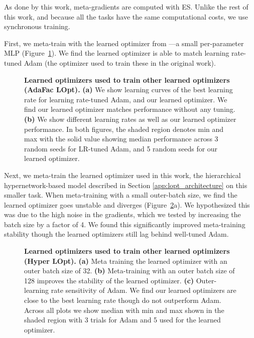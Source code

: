 \documentclass[11pt]{article}
\begin{document}
As done by this work, meta-gradients are computed with ES. Unlike the rest of this work, and because all the tasks have the same computational costs, we use synchronous training.

First, we meta-train with the learned optimizer from \citet{metz2022practical}---a small per-parameter MLP (Figure~\ref{fig:selfopt_adafac}).
We find the learned optimizer is able to match learning rate-tuned Adam (the optimizer used to train these in the original work).

\begin{figure}[t!]
    \centering
    \caption{\textbf{Learned optimizers used to train other learned optimizers (AdaFac LOpt).} \textbf{(a)} We show learning curves of the best learning rate for learning rate-tuned Adam, and our learned optimizer. We find our learned optimizer matches performance without any tuning. \textbf{(b)} We show different learning rates as well as our learned optimizer performance. In both figures, the shaded region denotes min and max with the solid value showing median performance across 3 random seeds for LR-tuned Adam, and 5 random seeds for our learned optimizer.
    \label{fig:selfopt_adafac}
    }
\end{figure}

Next, we meta-train the learned optimizer used in this work, the hierarchical hypernetwork-based model described in Section \ref{app:lopt_architecture} on this smaller task.  
When meta-training with a small outer-batch size, we find the learned optimizer goes unstable and diverges (Figure~\ref{fig:selfopt_hyperlopt}a).
We hypothesized this was due to the high noise in the gradients, which we tested by increasing the batch size by a factor of 4.
We found this significantly improved meta-training stability though the learned optimizers still lag behind well-tuned Adam.

\begin{figure}[t!]
    \centering
    \caption{\textbf{Learned optimizers used to train other learned optimizers (Hyper LOpt).} \textbf{(a)} Meta training the learned optimizer with an outer batch size of 32. \textbf{(b)} Meta-training with an outer batch size of 128 improves the stability of the learned optimizer. \textbf{(c)} Outer-learning rate sensitivity of Adam. We find our learned optimizers are close to the best learning rate though do not outperform Adam. Across all plots we show median with min and max shown in the shaded region with 3 trials for Adam and 5 used for the learned optimizer.
    \label{fig:selfopt_hyperlopt}
    }
\end{figure}
\end{document}
